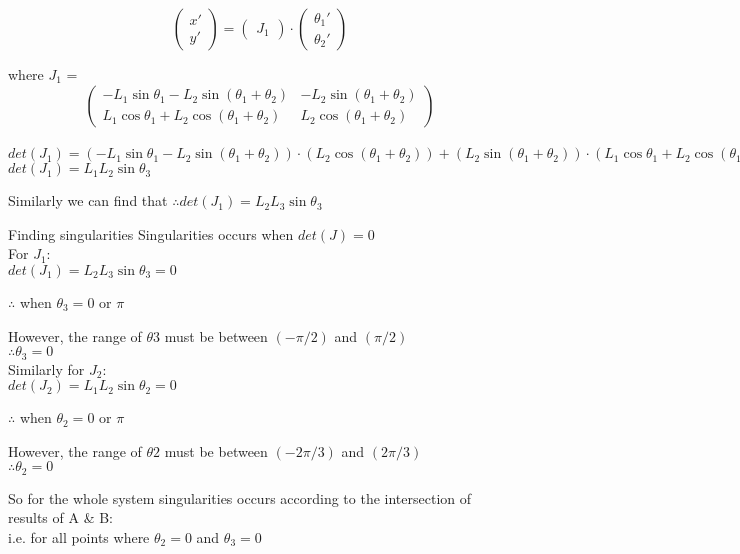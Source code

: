 $$
\begin{pmatrix}
x'\\y'
\end{pmatrix} =
\begin{pmatrix}
J_{1}
\end{pmatrix}\cdot
\begin{pmatrix}
\theta_{1}'\\\theta_{2}'
\end{pmatrix}
$$

\hspace{40mm} where $J_{1}$ = 
$$
\begin{pmatrix}
- L_{1}\sin\theta_{1} - L_{2}\sin(\theta_{1} + \theta_{2}) & -L_{2}\sin(\theta_{1} + \theta_{2})\\
L_{1}\cos\theta_{1} + L_{2}\cos(\theta_{1} + \theta_{2}) & L_{2}\cos(\theta_{1} + \theta_{2})
\end{pmatrix}
$$\\

$det(J_{1}) = (- L_{1}\sin\theta_{1} - L_{2}\sin(\theta_{1} + \theta_{2}))\cdot(L_{2}\cos(\theta_{1} + \theta_{2})) + (L_{2}\sin(\theta_{1} + \theta_{2}))\cdot(L_{1}\cos\theta_{1} + L_{2}\cos(\theta_{1} + \theta_{2}))$\\

$det(J_{1}) = L_{1}L_{2}\sin\theta_{3}$\\
\newline
\vspace{5mm}

Similarly we can find that
\newline
\vspace{5mm}
$\therefore det(J_{1}) = L_{2}L_{3}\sin\theta_{3}$\\
\vspace{2mm}

Finding singularities
Singularities occurs when $det⁡(J)=0$\\

For $J_{1}$:\\

$det(J_{1}) = L_{2}L_{3}\sin\theta_{3} = 0$

$\therefore $ when $ \theta_{3} = 0$ or $\pi$

However, the range of $\theta{3}$ must be between $(-\pi/2)$ and $(\pi/2)$\\
$\therefore \theta_{3} = 0$\\
\newline
\vspace{5mm}
Similarly for $J_{2}$:\\

$det(J_{2}) = L_{1}L_{2}\sin\theta_{2} = 0$

$\therefore $ when $ \theta_{2} = 0$ or $\pi$

However, the range of $\theta{2}$ must be between $(-2\pi/3)$ and $(2\pi/3)$\\
$\therefore \theta_{2} = 0$

So for the whole system singularities occurs according to the intersection of results of A & B:\\
i.e. for all points where $\theta_{2} = 0$ and $ \theta_{3} = 0$